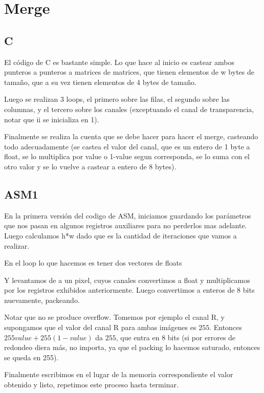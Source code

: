 \section{Merge}

\subsection{C}
El código de C es bastante simple. Lo que hace al inicio es castear ambos punteros a punteros a matrices de matrices, que tienen elementos de w bytes de tamaño, que a su vez tienen elementos de 4 bytes de tamaño.

Luego se realizan 3 loops, el primero sobre las filas, el segundo sobre las columnas, y el tercero sobre los canales (exceptuando el canal de transparencia, notar que ii se inicializa en 1).

Finalmente se realiza la cuenta que se debe hacer para hacer el merge, casteando todo adecuadamente (se castea el valor del canal, que es un entero de 1 byte a float, se lo multiplica por value o 1-value segun corresponda, se lo suma con el otro valor y se lo vuelve a castear a entero de 8 bytes).

\subsection{ASM1}

En la primera versión del codigo de ASM, iniciamos guardando los parámetros que nos pasan en algunos registros auxiliares para no perderlos mas adelante.
Luego calculamos h*w dado que es la cantidad de iteraciones que vamos a realizar.

En el loop lo que hacemos es tener dos vectores de floats



Y levantamos de a un pixel, cuyos canales convertimos a float y multiplicamos por los registros exhibidos anteriormente. Luego convertimos a enteros de 8 bits nuevamente, packeando.

Notar que no se produce overflow. Tomemos por ejemplo el canal R, y supongamos que el valor del canal R para ambas imágenes es $255$.
Entonces $255value + 255(1-value)$ da $255$, que entra en 8 bits (si por errores de redondeo diera más, no importa, ya que el packing lo hacemos saturado, entonces se queda en 255).

Finalmente escribimos en el lugar de la memoria correspondiente el valor obtenido y listo, repetimos este proceso hasta terminar.
\\

